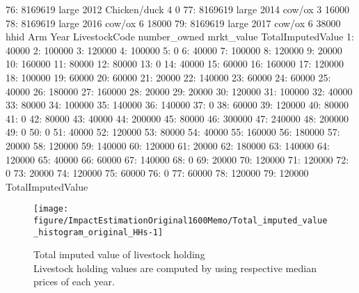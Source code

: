 \begin{Schunk}
\begin{Soutput}
76: 8169619       large 2012  Chicken/duck            4          0
77: 8169619       large 2014        cow/ox            3      16000
78: 8169619       large 2016        cow/ox            6      18000
79: 8169619       large 2017        cow/ox            6      38000
       hhid         Arm Year LivestockCode number_owned mrkt_value
    TotalImputedValue
 1:             40000
 2:            100000
 3:            120000
 4:            100000
 5:                 0
 6:             40000
 7:            100000
 8:            120000
 9:             20000
10:            160000
11:             80000
12:             80000
13:                 0
14:             40000
15:             60000
16:            160000
17:            120000
18:            100000
19:             60000
20:             60000
21:             20000
22:            140000
23:             60000
24:             60000
25:             40000
26:            180000
27:            160000
28:             20000
29:             20000
30:            120000
31:            100000
32:             40000
33:             80000
34:            100000
35:            140000
36:            140000
37:                 0
38:             60000
39:            120000
40:             80000
41:                 0
42:             80000
43:             40000
44:            200000
45:             80000
46:            300000
47:            240000
48:            200000
49:                 0
50:                 0
51:             40000
52:            120000
53:             80000
54:             40000
55:            160000
56:            180000
57:             20000
58:            120000
59:            140000
60:            120000
61:             20000
62:            180000
63:            140000
64:            120000
65:             40000
66:             60000
67:            140000
68:                 0
69:             20000
70:            120000
71:            120000
72:                 0
73:             20000
74:            120000
75:             60000
76:                 0
77:             60000
78:            120000
79:            120000
    TotalImputedValue
\end{Soutput}
\end{Schunk}
\begin{Schunk}
\begin{figure}

{\centering \texttt{[image: figure/ImpactEstimationOriginal1600Memo/Total\_imputed\_value\_histogram\_original\_HHs-1]} 

}

\caption{Total imputed value of livestock holding\\ {\footnotesize Livestock holding values are computed by using respective median prices of each year.\setlength{\baselineskip}{8pt}}}\label{Figure Total imputed value histogram original HHs}
\end{figure}
\end{Schunk}
